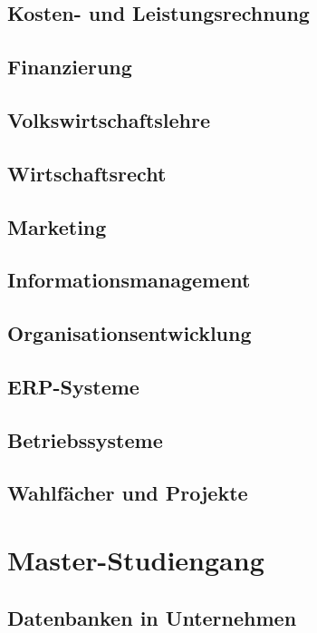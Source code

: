 \documentclass{hswbook}
\begin{document}
    \chapter{Kosten- und Leistungsrechnung}\label{chap:klr}
    \chapter{Finanzierung}\label{chap:finanzierung}
    \chapter{Volkswirtschaftslehre}\label{chap:vwl}
    \chapter{Wirtschaftsrecht}\label{chap:wr}
    \chapter{Marketing}\label{chap:marketing}
    \chapter{Informationsmanagement}\label{chap:infmgmt}
    \chapter{Organisationsentwicklung}\label{chap:oe}
    \chapter{ERP-Systeme}\label{chap:erp}
    \chapter{Betriebssysteme}\label{chap:bs}
    \chapter{Wahlfächer und Projekte}\label{chap:sonst1}

\part{Master-Studiengang}\label{part:ma-studiengang}
    \chapter{Datenbanken in Unternehmen}\label{chap:db2}
\end{document}
